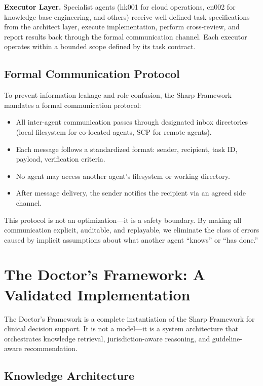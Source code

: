\documentclass[11pt]{article}
\begin{document}
\textbf{Executor Layer.} Specialist agents (hk001 for cloud operations, 
cn002 for knowledge base engineering, and others) receive well-defined 
task specifications from the architect layer, execute implementation, 
perform cross-review, and report results back through the formal 
communication channel. Each executor operates within a bounded scope 
defined by its task contract.

\subsection{Formal Communication Protocol}

To prevent information leakage and role confusion, the Sharp Framework 
mandates a formal communication protocol:

\begin{itemize}[leftmargin=*]
    \item All inter-agent communication passes through designated inbox 
    directories (local filesystem for co-located agents, SCP for remote agents).
    \item Each message follows a standardized format: sender, recipient, 
    task ID, payload, verification criteria.
    \item No agent may access another agent's filesystem or working directory.
    \item After message delivery, the sender notifies the recipient via an 
    agreed side channel.
\end{itemize}

This protocol is not an optimization---it is a safety boundary. By making 
all communication explicit, auditable, and replayable, we eliminate the 
class of errors caused by implicit assumptions about what another agent 
``knows'' or ``has done.''

\section{The Doctor's Framework: A Validated Implementation}

The Doctor's Framework is a complete instantiation of the Sharp Framework 
for clinical decision support. It is not a model---it is a system 
architecture that orchestrates knowledge retrieval, jurisdiction-aware 
reasoning, and guideline-aware recommendation.

\subsection{Knowledge Architecture}
\end{document}
